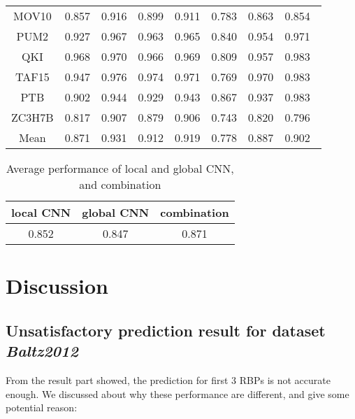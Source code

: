 \documentclass[twoside,twocolumn]{article}
\begin{document}
\begin{table*}
\begin{tabular}{c|ccccccc}
  MOV10    & 0.857 & 0.916 & 0.899 & 0.911 & 0.783 & 0.863 & 0.854 \\
  PUM2     & 0.927 & 0.967 & 0.963 & 0.965 & 0.840 & 0.954 & 0.971 \\
  QKI      & 0.968 & 0.970 & 0.966 & 0.969 & 0.809 & 0.957 & 0.983 \\
  TAF15    & 0.947 & 0.976 & 0.974 & 0.971 & 0.769 & 0.970 & 0.983 \\
  PTB      & 0.902 & 0.944 & 0.929 & 0.943 & 0.867 & 0.937 & 0.983 \\
  ZC3H7B   & 0.817 & 0.907 & 0.879 & 0.906 & 0.743 & 0.820 & 0.796 \\
  Mean     & 0.871 & 0.931 & 0.912 & 0.919 & 0.778 & 0.887 & 0.902 \\
  \bottomrule
  \end{tabular}
  \end{table*}
  

\begin{table}
  \caption{Average performance of local and global CNN, and combination}
  \centering
  \begin{tabular}{c|c|c}
    \toprule
    local CNN & global CNN & combination \\
    \midrule
    0.852 & 0.847 & 0.871 \\
    \bottomrule
  \end{tabular}
\end{table}

\section{Discussion}

\subsection{Unsatisfactory prediction result for dataset \em Baltz2012}

From the result part showed, the prediction for first 3 RBPs is not accurate enough. We discussed about why these performance are different, and give some potential reason:
\end{document}
